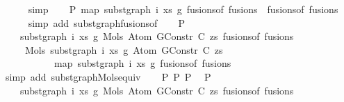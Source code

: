 \begin{isabellebody}
\ \ \ \ \isamarkupfalse%
\ simp\isanewline
\isanewline
\ \ \isamarkupfalse%
\ P{}{\isacharcolon}{\kern0pt}\ {\isachardoublequoteopen}map\ {\isacharparenleft}{\kern0pt}subst{\isacharunderscore}{\kern0pt}graph\ i\ xs\ g{}{\isacharparenright}{\kern0pt}\ {\isacharparenleft}{\kern0pt}fusions{\isacharunderscore}{\kern0pt}of\ fusions{\isacharparenright}{\kern0pt}\ {\isacharequal}{\kern0pt}\ fusions{\isacharunderscore}{\kern0pt}of\ fusions{\isachardoublequoteclose}\isanewline
\ \ \ \ \isamarkupfalse%
\ {\isacharparenleft}{\kern0pt}simp\ add{\isacharcolon}{\kern0pt}\ subst{\isacharunderscore}{\kern0pt}graph{\isacharunderscore}{\kern0pt}fusions{\isacharunderscore}{\kern0pt}of{\isacharparenright}{\kern0pt}\isanewline
\isanewline
\ \ \isamarkupfalse%
\ P{}{\isacharcolon}{\kern0pt}\isanewline
\ \ \ \ {\isachardoublequoteopen}subst{\isacharunderscore}{\kern0pt}graph\ i\ xs\ g{}\ {\isacharparenleft}{\kern0pt}Mols{}\ {\isacharparenleft}{\kern0pt}Atom\ {\isacharparenleft}{\kern0pt}GConstr\ C{\isacharparenright}{\kern0pt}\ zs{\isacharparenright}{\kern0pt}\ {\isacharparenleft}{\kern0pt}fusions{\isacharunderscore}{\kern0pt}of\ fusions{\isacharparenright}{\kern0pt}{\isacharparenright}{\kern0pt}\ {\isacharequal}{\kern0pt}\isanewline
\ \ \ \ \ Mols{}\ {\isacharparenleft}{\kern0pt}subst{\isacharunderscore}{\kern0pt}graph\ i\ xs\ g{}\ {\isacharparenleft}{\kern0pt}Atom\ {\isacharparenleft}{\kern0pt}GConstr\ C{\isacharparenright}{\kern0pt}\ zs{\isacharparenright}{\kern0pt}{\isacharparenright}{\kern0pt}\isanewline
\ \ \ \ \ \ \ \ \ \ \ {\isacharparenleft}{\kern0pt}map\ {\isacharparenleft}{\kern0pt}subst{\isacharunderscore}{\kern0pt}graph\ i\ xs\ g{}{\isacharparenright}{\kern0pt}\ {\isacharparenleft}{\kern0pt}fusions{\isacharunderscore}{\kern0pt}of\ fusions{\isacharparenright}{\kern0pt}{\isacharparenright}{\kern0pt}{\isachardoublequoteclose}\isanewline
\ \ \ \ \isamarkupfalse%
\ {\isacharparenleft}{\kern0pt}simp\ add{\isacharcolon}{\kern0pt}\ subst{\isacharunderscore}{\kern0pt}graph{\isacharunderscore}{\kern0pt}Mols{}{\isacharunderscore}{\kern0pt}equiv{\isacharparenright}{\kern0pt}\isanewline
\isanewline
\ \ \isamarkupfalse%
\ P{}\ P{}\ P{}\ \isamarkupfalse%
\ P{}{\isacharcolon}{\kern0pt}\isanewline
\ \ \ \ {\isachardoublequoteopen}subst{\isacharunderscore}{\kern0pt}graph\ i\ xs\ g{}\ {\isacharparenleft}{\kern0pt}Mols{}\ {\isacharparenleft}{\kern0pt}Atom\ {\isacharparenleft}{\kern0pt}GConstr\ C{\isacharparenright}{\kern0pt}\ zs{\isacharparenright}{\kern0pt}\ {\isacharparenleft}{\kern0pt}fusions{\isacharunderscore}{\kern0pt}of\ fusions{\isacharparenright}{\kern0pt}{\isacharparenright}{\kern0pt}\ {\isacharequal}{\kern0pt}\isanewline

\end{isabellebody}
